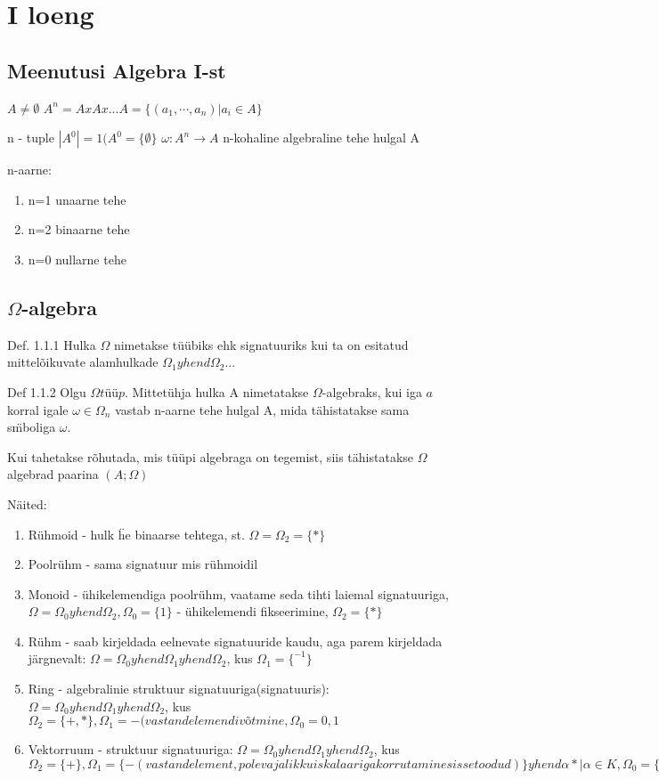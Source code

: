 \documentclass[12pt]{book}
\begin{document}
\chapter{I loeng}

\section{Meenutusi Algebra I-st}

$A \neq \emptyset$
$A^n = A x A x ... A = \{(a_1,\cdots,a_n)| a_i \in A \}$

n - tuple
$|A^0| = 1 (A^0 = \{ \emptyset \}$
$\omega: A^n \rightarrow A$ 
n-kohaline algebraline tehe hulgal A

n-aarne:
\begin{enumerate}
\item n=1 unaarne tehe
\item n=2 binaarne tehe
\item n=0 nullarne tehe
\end{enumerate}


\section{$\Omega$-algebra}

Def. 1.1.1 Hulka $\Omega$ nimetakse t\"u\"ubiks ehk signatuuriks kui ta on esitatud mittelõikuvate alamhulkade $\Omega_1 yhend \Omega_2...$

Def 1.1.2 Olgu $\Omega tüüp$. Mittet\"uhja hulka A nimetatakse $\Omega$-algebraks, kui iga $a$ korral igale $\omega \in \Omega_n$ vastab n-aarne tehe hulgal A, mida tähistatakse sama s\"mboliga $\omega$. 

Kui tahetakse rõhutada, mis t\"u\"upi algebraga on tegemist, siis tähistatakse $\Omega$ algebrad paarina $(A;\Omega)$

Näited:

\begin{enumerate}
\item R\"uhmoid - hulk \"he binaarse tehtega, st. $\Omega= \Omega_2 = \{*\}$
\item Poolr\"uhm - sama signatuur mis r\"uhmoidil
\item Monoid - \"uhikelemendiga poolr\"uhm, vaatame seda tihti laiemal signatuuriga, $\Omega = \Omega_0 yhend \Omega_2, \Omega_0 = \{1\}$ - \"uhikelemendi fikseerimine, $\Omega_2 = \{*\}$
\item R\"uhm - saab kirjeldada eelnevate signatuuride kaudu, aga parem kirjeldada järgnevalt: $\Omega = \Omega_0 yhend \Omega_1 yhend \Omega_2$, kus $\Omega_1 = \{ ^{-1}\}$
\item Ring - algebralinie struktuur signatuuriga(signatuuris): $\Omega = \Omega_0 yhend \Omega_1 yhend \Omega_2$, kus $\Omega_2 = \{+,*\}, \Omega_1 = {-(vastandelemendi võtmine}, \Omega_0 = {0,1}$
\item Vektorruum - struktuur signatuuriga:
$\Omega = \Omega_0 yhend \Omega_1 yhend \Omega_2$, kus
$\Omega_2 = \{+\}, \Omega_1 = \{-(vastandelement, pole vajalik kui skalaariga korrutamine sissetoodud)\} yhend {\alpha * | \alpha \in K}, \Omega_0 = \{0\} - samuti avaldatav skalaariga korrutimase kaudu$ 
\end{enumerate}
\end{document}
